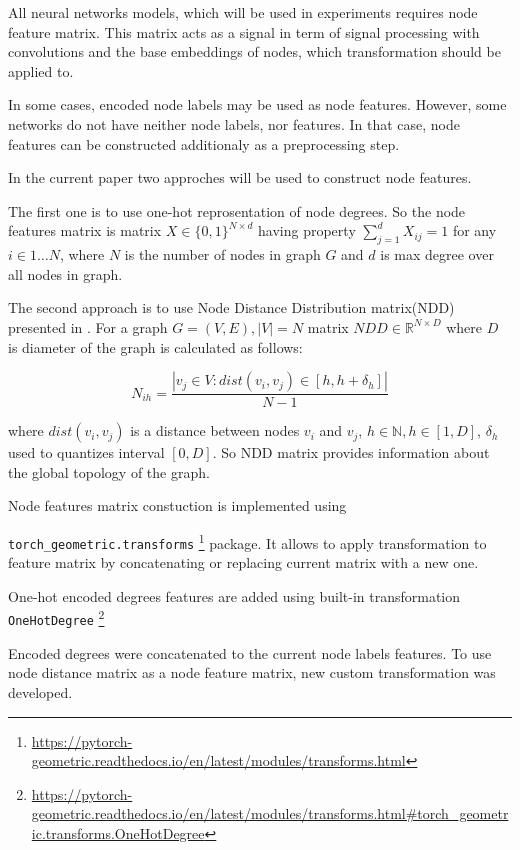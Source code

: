 All neural networks models, which will be used in experiments requires node feature matrix. This matrix
acts as a signal in term of signal processing with convolutions and the base embeddings of nodes,
which transformation should be applied to.

In some cases, encoded node labels may be used as node features. However, some networks
do not have neither node labels, nor features.
In that case, node features can be constructed additionaly as a preprocessing step.

In the current paper two approches will be used to construct node features.

The first one is to use one-hot reprosentation of node degrees. So the node features matrix
is matrix $X \in \{0,1\}^{N \times d}$ having property $\sum_{j=1}^{d}X_{ij} = 1$ for any $i \in 1 \dots N$,
where $N$ is the number of nodes in graph $G$ and $d$ is max degree over all nodes in graph.


The second approach is to use Node Distance Distribution matrix(NDD) presented in \cite{Netpro2vec}.
For a graph $G=(V,E), |V|=N$ matrix $NDD \in \mathbb{R}^{N \times D}$ where $D$ is diameter of the graph is calculated as follows:

\begin{equation}
    N_{ih} = \frac{|v_j \in V : dist(v_i, v_j) \in [h, h + \delta_h]|}{N-1}
    \label{eq:ndd}
\end{equation}

where $dist(v_i, v_j)$ is a distance between nodes $v_i$ and $v_j$, $h \in \mathbb{N}, h \in [1,D]$,
$\delta_h$ used to quantizes interval $[0,D]$. So NDD matrix provides information about the global topology of the graph.


Node features matrix constuction is implemented using

\texttt{torch\_geometric.transforms} \footnote{\url{https://pytorch-geometric.readthedocs.io/en/latest/modules/transforms.html}}
package. It allows to apply transformation to feature matrix by concatenating or replacing current matrix with a new one.

One-hot encoded degrees features are added using built-in transformation \texttt{OneHotDegree}
\footnote{\url{https://pytorch-geometric.readthedocs.io/en/latest/modules/transforms.html\#torch_geometric.transforms.OneHotDegree}}

Encoded degrees were concatenated to the current node labels features. To use node distance matrix as a node feature matrix, new custom transformation was developed.

